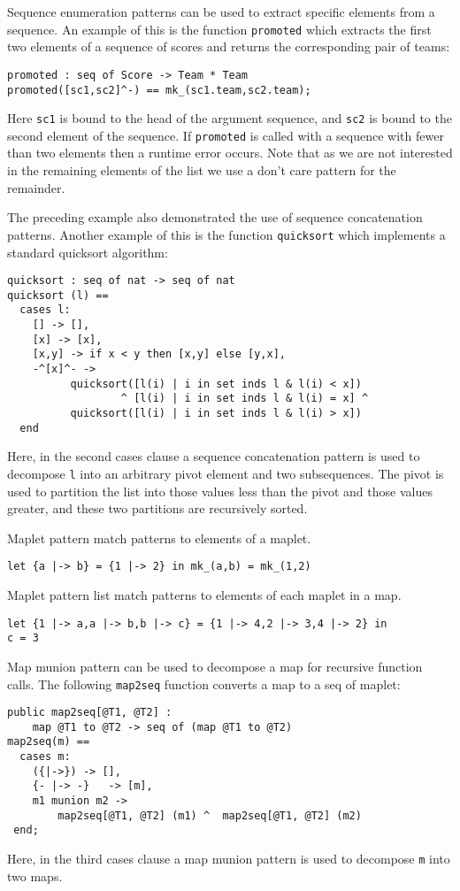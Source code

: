 \documentclass{overturerepchap}
\begin{document}
{\begin{description}
Sequence enumeration patterns can be used to extract specific elements
from a sequence. An example of this is the function \texttt{promoted}
which extracts the first two elements of a sequence of scores and
returns the corresponding pair of teams:
\begin{lstlisting}
promoted : seq of Score -> Team * Team
promoted([sc1,sc2]^-) == mk_(sc1.team,sc2.team);
\end{lstlisting}
Here \texttt{sc1} is bound to the head of the argument sequence, and
\texttt{sc2} is bound to the second element of the sequence. If
\texttt{promoted} is called with a sequence with fewer than two
elements then a runtime error occurs. Note that as we are not
interested in the remaining elements of the list we use a don't care
pattern for the remainder.

The preceding example also demonstrated the use of sequence
concatenation patterns. Another example of this is the function
\texttt{quicksort} which implements a standard quicksort algorithm:
\begin{lstlisting}
quicksort : seq of nat -> seq of nat
quicksort (l) ==
  cases l:
    [] -> [],
    [x] -> [x],
    [x,y] -> if x < y then [x,y] else [y,x],
    -^[x]^- ->
          quicksort([l(i) | i in set inds l & l(i) < x])
                  ^ [l(i) | i in set inds l & l(i) = x] ^
          quicksort([l(i) | i in set inds l & l(i) > x])
  end
\end{lstlisting}
Here, in the second cases clause a sequence concatenation pattern is
used to decompose \texttt{l} into an arbitrary pivot element and two
subsequences. The pivot is used to partition the list into those
values less than the pivot and those values greater, and these two
partitions are recursively sorted.


Maplet pattern match patterns to elements of a maplet.
\begin{lstlisting}
let {a |-> b} = {1 |-> 2} in mk_(a,b) = mk_(1,2)
\end{lstlisting}

Maplet pattern list match patterns to elements of each maplet in a map.
\begin{lstlisting}
let {1 |-> a,a |-> b,b |-> c} = {1 |-> 4,2 |-> 3,4 |-> 2} in
c = 3
\end{lstlisting}

Map munion pattern can be used to decompose a map for recursive function calls. The following \texttt{map2seq} function converts a map to a seq of maplet:
\begin{lstlisting}
public map2seq[@T1, @T2] :
    map @T1 to @T2 -> seq of (map @T1 to @T2)
map2seq(m) ==
  cases m:
    ({|->})	-> [],
    {- |-> -}	-> [m],
    m1 munion m2 ->
        map2seq[@T1, @T2] (m1) ^  map2seq[@T1, @T2] (m2)
 end;
\end{lstlisting}
Here, in the third cases clause a map munion pattern is used to decompose \texttt{m}
into two maps.


\end{description}}
\end{document}
